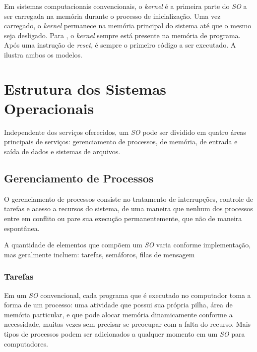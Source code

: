 
Em sistemas computacionais convencionais, o \emph{kernel} é a primeira parte do \emph{SO} a ser carregada na memória durante o processo de inicialização. Uma vez carregado, o \emph{kernel} permanece na memória principal do sistema até que o mesmo seja desligado. Para , o \emph{kernel} sempre está presente na memória de programa. Após uma instrução de \emph{reset}, é sempre o primeiro código a ser executado. A  ilustra ambos os modelos.


\section{Estrutura dos Sistemas Operacionais}

Independente dos serviços oferecidos, um \emph{SO} pode ser dividido em quatro áreas principais de serviços: gerenciamento de processos, de memória, de entrada e saída de dados e sistemas de arquivos.

\subsection{Gerenciamento de Processos}

O gerenciamento de processos consiste no tratamento de interrupções, controle de tarefas e acesso a recursos do sistema, de uma maneira que nenhum dos processos entre em conflito ou pare sua execução permanentemente, que não de maneira espontânea.

A quantidade de elementos que compõem um \emph{SO} varia conforme implementação, mas geralmente incluem: tarefas, semáforos, filas de mensagem

\subsubsection{Tarefas}

Em um \emph{SO} convencional, cada programa que é executado no computador toma a forma de um processo: uma atividade que possui sua própria pilha, área de memória particular, e que pode alocar memória dinamicamente conforme a necessidade, muitas vezes sem precisar se preocupar com a falta do recurso. Mais tipos de processos podem ser adicionados a qualquer momento em um \emph{SO} para computadores.

